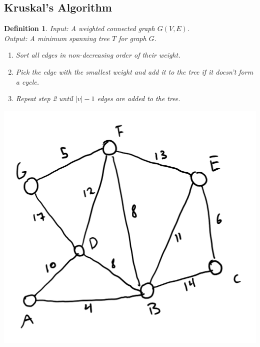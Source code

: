 \documentclass{report}
\newtheorem*{defn}{Definition}
\begin{document}
\subsection{Kruskal's Algorithm}
\begin{defn}
Input: A weighted connected graph $G(V,E)$.\\
Output: A minimum spanning tree $T$ for graph $G$.
\begin{enumerate}
\item Sort all edges in non-decreasing order of their weight.
\item Pick the edge with the smallest weight and add it to the tree if it doesn't form a cycle.
\item Repeat step 2 until $|v|-1$ edges are added to the tree.
\end{enumerate}
\end{defn}
\begin{center}
\includegraphics[scale=0.5]{SpanningTreeEx1.png}
\end{center}
\end{document}
